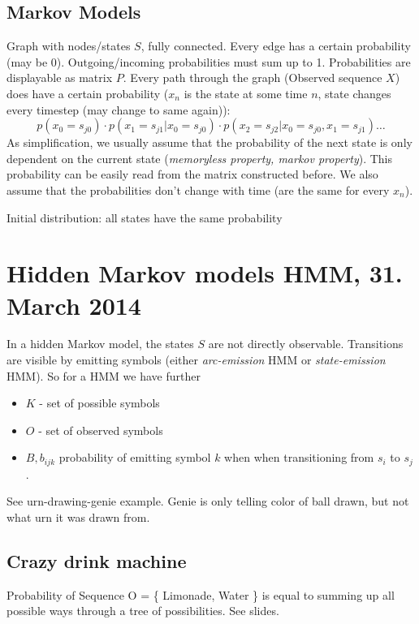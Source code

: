 \documentclass[11pt]{article}
\begin{document}
\subsection{Markov Models}
\label{sec:markov_models}
Graph with nodes/states $S$, fully connected. Every edge has a certain probability 
(may be 0). Outgoing/incoming probabilities must sum up to 1. Probabilities are displayable 
as matrix $P$. Every path through the graph (Observed sequence $X$) does have a certain probability ($x_n$ is the state
at some time $n$, state changes every timestep (may change to same again)):
\begin{equation}
	p(x_0 = s_{j0}) \cdot p(x_1 = s_{j1} |x_0 = s_{j0}) \cdot p(x_2 = s_{j2} | x_0 = s_{j0}, x_1 = s_{j1})\ldots
\end{equation}
As simplification, we usually assume that the probability of the 
next state is only dependent on the current state (\emph{memoryless property, markov property}). This probability can be easily read from the matrix constructed before.
We also assume that the probabilities don't change with time (are the same for every $x_n$).

Initial distribution: all states have the same probability

\section{Hidden Markov models HMM, 31. March 2014}
In a hidden Markov model, the states $S$ are not directly observable. Transitions are visible
by emitting symbols (either \emph{arc-emission} HMM or \emph{state-emission} HMM).
So for a HMM we have further
\begin{itemize}
	\item $K$ - set of possible symbols
	\item $O$ - set of observed symbols
	\item $B, b_{ijk}$ probability of emitting symbol $k$ when when transitioning from 
	$s_i$ to $s_j$.
\end{itemize}

See urn-drawing-genie example. Genie is only telling color of ball drawn, but not what urn
it was drawn from. 

\subsection{Crazy drink machine}
Probability of Sequence O = \{ Limonade, Water \} is equal to summing up all possible ways
through a tree of possibilities. See slides.
\end{document}
